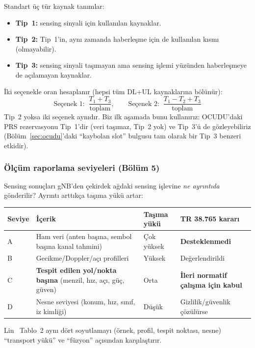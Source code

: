 Standart üç tür kaynak tanımlar:
\begin{itemize}
\item \textbf{Tip~1:} sensing sinyali için kullanılan kaynaklar.
\item \textbf{Tip~2:} Tip~1'in, aynı zamanda haberleşme için de kullanılan kısmı (olmayabilir).
\item \textbf{Tip~3:} sensing sinyali taşımayan ama sensing işlemi yüzünden haberleşmeye de açılamayan kaynaklar.
\end{itemize}
İki seçenekle oran hesaplanır (hepsi tüm DL+UL kaynaklarına bölünür):
\begin{equation}
\text{Seçenek 1: }\ \frac{T_1+T_3}{\text{toplam}},\qquad \text{Seçenek 2: }\ \frac{T_1-T_2+T_3}{\text{toplam}}
\end{equation}
Tip~2 yoksa iki seçenek aynıdır. Biz ilk aşamada bunu kullanırız: OCUDU'daki PRS rezervasyonu Tip~1'dir (veri taşımaz, Tip~2 yok) ve Tip~3'ü de gözleyebiliriz (Bölüm~\ref{sec:ocudu}'daki ``kaybolan slot'' bulgusu tam olarak bir Tip~3 benzeri etkidir).

\subsubsection{Ölçüm raporlama seviyeleri (Bölüm 5)}

Sensing sonuçları gNB'den çekirdek ağdaki sensing işlevine \emph{ne ayrıntıda} gönderilir? Ayrıntı arttıkça taşıma yükü artar:

\begingroup\sffamily\small
\begin{xltabular}{\textwidth}{@{}p{1.5cm}Xp{2.2cm}p{3.2cm}@{}}
\toprule
\textbf{Seviye} & \textbf{İçerik} & \textbf{Taşıma yükü} & \textbf{TR 38.765 kararı} \\
\midrule
A & Ham veri (anten başına, sembol başına kanal tahmini) & Çok yüksek & \textbf{Desteklenmedi} \\
B & Gecikme/Doppler/açı profilleri & Yüksek & Değerlendirildi \\
C & \textbf{Tespit edilen yol/nokta başına} (menzil, hız, açı, güç, güven) & Orta & \textbf{İleri normatif çalışma için kabul} \\
D & Nesne seviyesi (konum, hız, sınıf, iz kimliği) & Düşük & Gizlilik/güvenlik çözülürse \\
\bottomrule
\end{xltabular}
\endgroup
Lin~\cite{lin} Tablo~2 aynı dört soyutlamayı (örnek, profil, tespit noktası, nesne) ``transport yükü'' ve ``füzyon'' açısından karşılaştırır.

